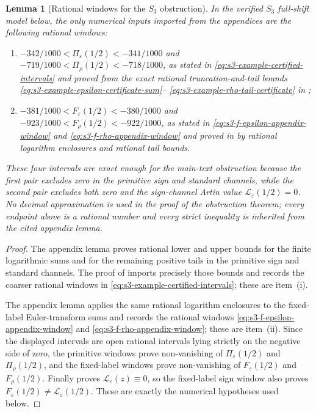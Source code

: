 \documentclass[11pt,a4paper]{amsart}
\theoremstyle{plain}
\newtheorem{lemma}[theorem]{Lemma}
\theoremstyle{definition}
\theoremstyle{remark}
\begin{document}
\begin{lemma}[Rational windows for the \(S_3\) obstruction]
  \label{lem:s3-main-text-certificate-summary}
  In the verified \(S_3\) full-shift model below, the only numerical
  inputs imported from the appendices are the following rational windows:
  \begin{enumerate}[label=\textup{(\roman*)},leftmargin=*]
    \item
    \(-342/1000<\Pi_\varepsilon(1/2)<-341/1000\) and
    \(-719/1000<\Pi_\rho(1/2)<-718/1000\), as stated in
    \eqref{eq:s3-example-certified-intervals} and proved from the exact
    rational truncation-and-tail bounds
    \eqref{eq:s3-example-epsilon-certificate-sum}--
    \eqref{eq:s3-example-rho-tail-certificate} in
    ;
    \item
    \(-381/1000<F_\varepsilon(1/2)<-380/1000\) and
    \(-923/1000<F_\rho(1/2)<-922/1000\), as stated in
    \eqref{eq:s3-f-epsilon-appendix-window} and
    \eqref{eq:s3-f-rho-appendix-window} and proved in
     by rational logarithm
    enclosures and rational tail bounds.
  \end{enumerate}
  These four intervals are exact enough for the main-text obstruction because
  the first pair excludes zero in the primitive sign and standard channels,
  while the second pair excludes both zero and the sign-channel Artin value
  \(\mathcal L_\varepsilon(1/2)=0\).  No decimal approximation is used in
  the proof of the obstruction theorem; every endpoint above is a rational
  number and every strict inequality is inherited from the cited appendix
  lemma.
\end{lemma}

\begin{proof}
  The appendix lemma
   proves rational lower and upper
  bounds for the finite logarithmic sums and for the remaining positive
  tails in the primitive sign and standard channels.  The proof of
   imports precisely those bounds
  and records the coarser rational windows in
  \eqref{eq:s3-example-certified-intervals}; these are item~\textup{(i)}.

  The appendix lemma
   applies the same rational
  logarithm enclosures to the fixed-label Euler-transform sums and records
  the rational windows
  \eqref{eq:s3-f-epsilon-appendix-window} and
  \eqref{eq:s3-f-rho-appendix-window}; these are item~\textup{(ii)}.  Since
  the displayed intervals are open rational intervals lying strictly on the
  negative side of zero, the primitive windows prove non-vanishing of
  \(\Pi_\varepsilon(1/2)\) and \(\Pi_\rho(1/2)\), and the fixed-label windows
  prove non-vanishing of \(F_\varepsilon(1/2)\) and
  \(F_\rho(1/2)\).  Finally  proves
  \(\mathcal L_\varepsilon(z)\equiv0\), so the fixed-label sign window also
  proves \(F_\varepsilon(1/2)\ne\mathcal L_\varepsilon(1/2)\).  These are
  exactly the numerical hypotheses used below.
\end{proof}
\end{document}
